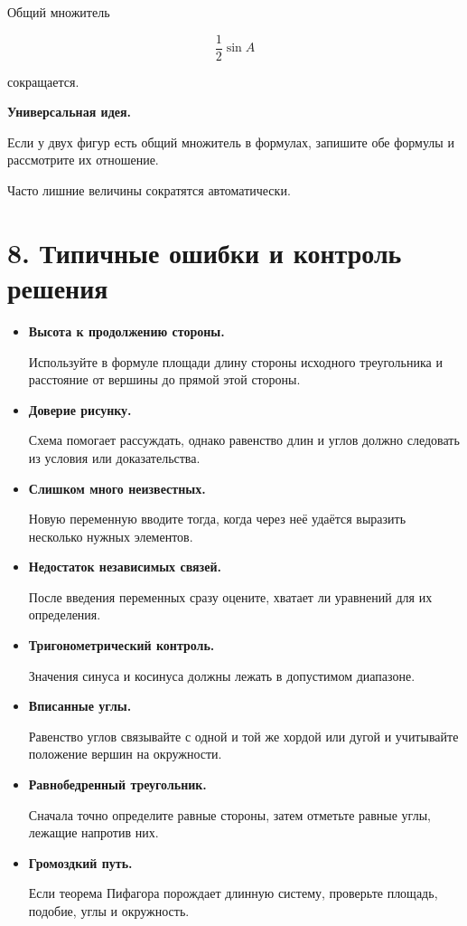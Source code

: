 \documentclass[a4paper,12pt]{article}
\newcommand{\important}[1]{%
  \textbf{\color{darkaccent}#1}%
}
\begin{document}
Общий множитель

\[
\frac12\sin A
\]

сокращается.

\important{Универсальная идея.}
Если у двух фигур есть общий множитель в формулах,
запишите обе формулы и рассмотрите их отношение.

Часто лишние величины сократятся автоматически.


\clearpage
\section{8. Типичные ошибки и контроль решения}

\begin{itemize}

  \item
  \important{Высота к продолжению стороны.}

  Используйте в формуле площади длину стороны
  исходного треугольника и расстояние от вершины
  до прямой этой стороны.

  \item
  \important{Доверие рисунку.}

  Схема помогает рассуждать,
  однако равенство длин и углов
  должно следовать из условия или доказательства.

  \item
  \important{Слишком много неизвестных.}

  Новую переменную вводите тогда,
  когда через неё удаётся выразить
  несколько нужных элементов.

  \item
  \important{Недостаток независимых связей.}

  После введения переменных сразу оцените,
  хватает ли уравнений для их определения.

  \item
  \important{Тригонометрический контроль.}

  Значения синуса и косинуса
  должны лежать в допустимом диапазоне.

  \item
  \important{Вписанные углы.}

  Равенство углов связывайте
  с одной и той же хордой или дугой
  и учитывайте положение вершин на окружности.

  \item
  \important{Равнобедренный треугольник.}

  Сначала точно определите равные стороны,
  затем отметьте равные углы,
  лежащие напротив них.

  \item
  \important{Громоздкий путь.}

  Если теорема Пифагора порождает длинную систему,
  проверьте площадь, подобие, углы и окружность.

\end{itemize}
\end{document}
